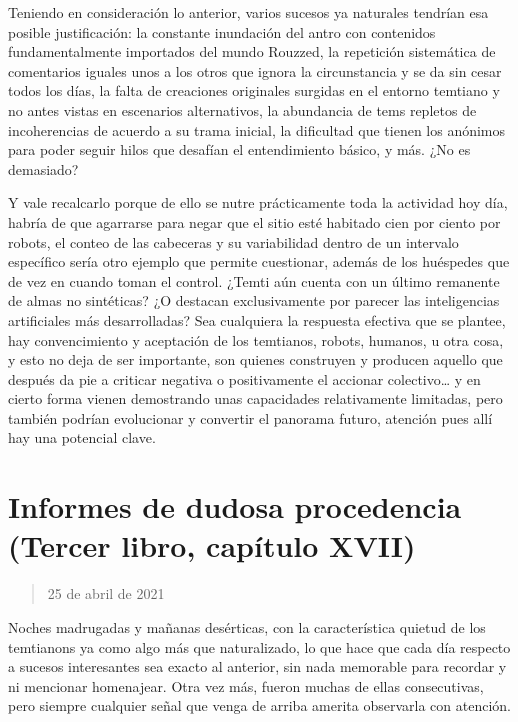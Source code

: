 \documentclass[
]{book}
\begin{document}
Teniendo en consideración lo anterior, varios sucesos ya naturales tendrían esa posible justificación: la constante inundación del antro con contenidos fundamentalmente importados del mundo Rouzzed, la repetición sistemática de comentarios iguales unos a los otros que ignora la circunstancia y se da sin cesar todos los días, la falta de creaciones originales surgidas en el entorno temtiano y no antes vistas en escenarios alternativos, la abundancia de tems repletos de incoherencias de acuerdo a su trama inicial, la dificultad que tienen los anónimos para poder seguir hilos que desafían el entendimiento básico, y más. ¿No es demasiado?

Y vale recalcarlo porque de ello se nutre prácticamente toda la actividad hoy día, habría de que agarrarse para negar que el sitio esté habitado cien por ciento por robots, el conteo de las cabeceras y su variabilidad dentro de un intervalo específico sería otro ejemplo que permite cuestionar, además de los huéspedes que de vez en cuando toman el control. ¿Temti aún cuenta con un último remanente de almas no sintéticas? ¿O destacan exclusivamente por parecer las inteligencias artificiales más desarrolladas? Sea cualquiera la respuesta efectiva que se plantee, hay convencimiento y aceptación de los temtianos, robots, humanos, u otra cosa, y esto no deja de ser importante, son quienes construyen y producen aquello que después da pie a criticar negativa o positivamente el accionar colectivo\ldots{} y en cierto forma vienen demostrando unas capacidades relativamente limitadas, pero también podrían evolucionar y convertir el panorama futuro, atención pues allí hay una potencial clave.

\hypertarget{informes-de-dudosa-procedencia-tercer-libro-capuxedtulo-xvii}{%
\section{Informes de dudosa procedencia (Tercer libro, capítulo XVII)}\label{informes-de-dudosa-procedencia-tercer-libro-capuxedtulo-xvii}}

\begin{quote}
25 de abril de 2021
\end{quote}

Noches madrugadas y mañanas desérticas, con la característica quietud de los temtianons ya como algo más que naturalizado, lo que hace que cada día respecto a sucesos interesantes sea exacto al anterior, sin nada memorable para recordar y ni mencionar homenajear. Otra vez más, fueron muchas de ellas consecutivas, pero siempre cualquier señal que venga de arriba amerita observarla con atención.
\end{document}

